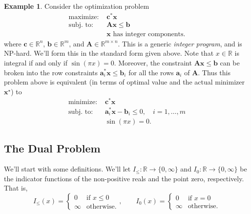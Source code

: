 \documentclass[10pt,letterpaper]{article}
\theoremstyle{definition}
\newtheorem{example}[theorem]{Example}
\theoremstyle{remark}
\newcommand\R{\mathbb{R}}
\newcommand\A{\boldsymbol{A}}
\newcommand\x{\boldsymbol{x}}
\renewcommand\c{\boldsymbol{c}}
\renewcommand\a{\boldsymbol{a}}
\renewcommand\b{\boldsymbol{b}}
\begin{document}
\begin{example}
    Consider the optimization problem
    \begin{align*}
        \text{maximize: } & \c^*\x\\
        \text{subj. to: } & \A\x \leq \b\\
                          & \x\text{ has integer components.}
    \end{align*}
    where $\c\in\R^n$, $\b\in\R^m$, and $\A\in\R^{m\times n}$. This is
    a generic \emph{integer program}, and is NP-hard. We'll form this in the
    standard form given above. Note that $x\in\R$ is integral if and only if
    $\sin(\pi x) = 0$. Moreover, the constraint $\A\x \leq \b$ can be broken into the
    row constraints $\a_i^*\x \leq \b_i$ for all the rows $\a_i$ of $\A$. Thus this
    problem above is equivalent (in terms of optimal value and the actual minimizer $\x^\star$)
    to
    \begin{align*}
        \text{minimize: } & \c^*\x\\
        \text{subj. to: } & \a_i^*\x - \b_i \leq 0,\quad i=1,\ldots,m\\
                          & \sin(\pi x) = 0.
    \end{align*}
\end{example}

\subsection{The Dual Problem}

We'll start with some definitions. We'll let $I_\leq :\R\to \{0,\infty\}$ and $I_0 :\R \to \{0,\infty\}$
be the indicator functions of the non-positive reals and the point zero, respectively. That is,
\[
    I_\leq(x) = \begin{cases}
        0 & \text{if }x\leq 0\\
        \infty & \text{otherwise.}
    \end{cases},\qquad I_0(x) = \begin{cases}
        0 & \text{if }x=0\\
        \infty & \text{otherwise.}
    \end{cases}
\]
\end{document}
